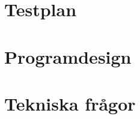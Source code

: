 \documentclass[a4paper, 11pt]{article}
\begin{document}
\subsection{}


\subsection{}


\section{Testplan}
\label{sec:testplan}

\subsection{}


\subsection{}


\subsection{}


\section{Programdesign}
\label{sec:design}

\subsection{}


\subsection{}


\subsection{}


\section{Tekniska frågor}
\label{sec:qa}
\end{document}
